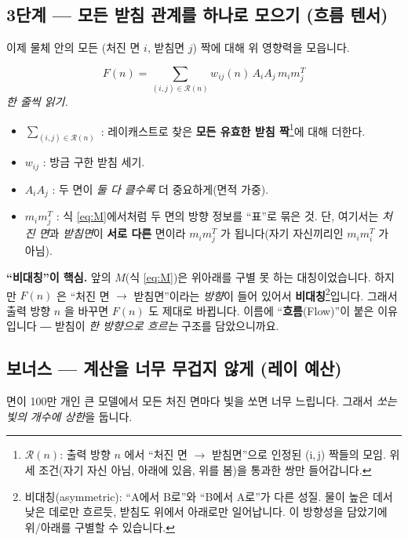 \documentclass[11pt,a4paper]{article}
\begin{document}
\subsection{3단계 — 모든 받침 관계를 하나로 모으기 (흐름 텐서)}

이제 물체 안의 모든 (처진 면 $i$, 받침면 $j$) 짝에 대해 위 영향력을 모읍니다.

\begin{equation}
F(n)=\sum_{(i,j)\in\mathcal{R}(n)} w_{ij}(n)\,A_iA_j\,m_im_j^{T}
\label{eq:F}
\end{equation}
\noindent\textit{한 줄씩 읽기.}
\begin{itemize}[leftmargin=1.6em]
\item $\sum_{(i,j)\in\mathcal{R}(n)}$ : 레이캐스트로 찾은 \textbf{모든 유효한
받침 짝}\footnote{$\mathcal{R}(n)$: 출력 방향 $n$ 에서 ``처진 면 $\to$ 받침면''으로
인정된 (i,\,j) 짝들의 모임. 위 세 조건(자기 자신 아님, 아래에 있음, 위를 봄)을 통과한
쌍만 들어갑니다.}에 대해 더한다.
\item $w_{ij}$ : 방금 구한 받침 세기.
\item $A_iA_j$ : 두 면이 \emph{둘 다 클수록} 더 중요하게(면적 가중).
\item $m_im_j^{T}$ : 식 \eqref{eq:M}에서처럼 두 면의 방향 정보를 ``표''로 묶은 것.
단, 여기서는 \emph{처진 면}과 \emph{받침면}이 \textbf{서로 다른} 면이라
$m_i m_j^{T}$ 가 됩니다(자기 자신끼리인 $m_i m_i^T$ 가 아님).
\end{itemize}

\begin{notebox}
\textbf{``비대칭''이 핵심.} 앞의 $M$(식 \eqref{eq:M})은 위아래를 구별 못 하는
대칭이었습니다. 하지만 $F(n)$ 은 ``처진 면 $\to$ 받침면''이라는 \emph{방향}이
들어 있어서 \textbf{비대칭}\footnote{비대칭(asymmetric): ``A에서 B로''와 ``B에서
A로''가 다른 성질. 물이 높은 데서 낮은 데로만 흐르듯, 받침도 위에서 아래로만
일어납니다. 이 방향성을 담았기에 위/아래를 구별할 수 있습니다.}입니다. 그래서
출력 방향 $n$ 을 바꾸면 $F(n)$ 도 제대로 바뀝니다. 이름에 ``\textbf{흐름}(Flow)''이
붙은 이유입니다 ― 받침이 \emph{한 방향으로 흐르는} 구조를 담았으니까요.
\end{notebox}

\subsection{보너스 — 계산을 너무 무겁지 않게 (레이 예산)}

면이 100만 개인 큰 모델에서 모든 처진 면마다 빛을 쏘면 너무 느립니다. 그래서
\emph{쏘는 빛의 개수에 상한}을 둡니다.
\end{document}
